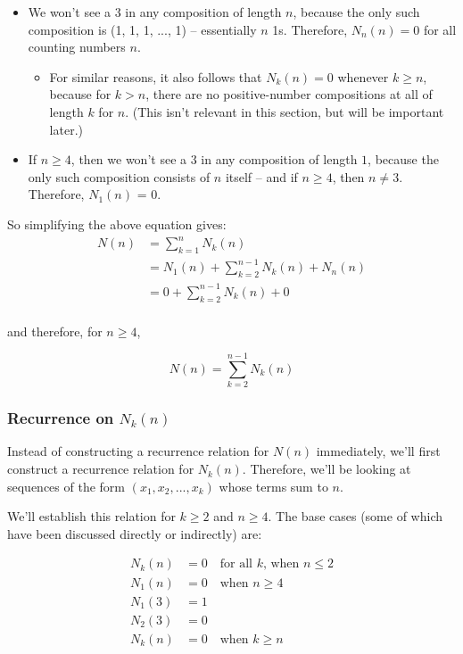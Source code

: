 \begin{itemize}
\item We won't see a 3 in any composition of length $n$, because the only such composition is (1, 1, 1, ..., 1) -- essentially $n$ 1s. Therefore, $N_n(n) = 0$ for all counting numbers $n$.
\begin{itemize}
\item For similar reasons, it also follows that $N_k(n) = 0$ whenever $k \geq n$, because for $k > n$, there are no positive-number compositions at all of length $k$ for $n$. (This isn't relevant in this section, but will be important later.)
\end{itemize}
\item If $n \geq 4$, then we won't see a 3 in any composition of length $1$, because the only such composition consists of $n$ itself -- and if $n \geq 4$, then $n \neq 3$. Therefore, $N_1(n)$ = 0. 
\end{itemize}

So simplifying the above equation gives:
\begin{align*}
N(n) &= \sum_{k=1}^{n} N_k(n) \\
&= N_1(n) + \sum_{k=2}^{n-1} N_k(n) + N_n(n) \\
&= 0 + \sum_{k=2}^{n-1} N_k(n) + 0 \\
\end{align*}

and therefore, for $n \geq 4$,

\begin{equation}
\label{composition-num-3s-n-nk}
N(n) = \sum_{k=2}^{n-1} N_k(n)
\end{equation}

\subsubsection{Recurrence on $N_k(n)$}

Instead of constructing a recurrence relation for $N(n)$ immediately, we'll first construct a recurrence relation for $N_k(n)$. Therefore, we'll be looking at sequences of the form $(x_1, x_2, ..., x_k)$ whose terms sum to $n$.

We'll establish this relation for $k \geq 2$ and $n \geq 4$. The base cases (some of which have been discussed directly or indirectly) are:

\begin{align*}
N_k(n) &= 0 \quad \text{for all $k$, when } n \leq 2 \\
N_1(n) &= 0 \quad \text{when } n \geq 4 \\
N_1(3) &= 1 \\
N_2(3) &= 0 \\
N_k(n) &= 0 \quad \text{when } k \geq n \\
\end{align*}

